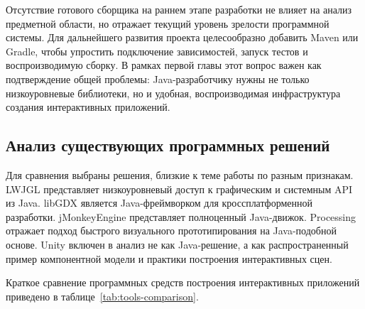 Отсутствие готового сборщика на раннем этапе разработки не влияет на
анализ предметной области, но отражает текущий уровень зрелости
программной системы. Для дальнейшего развития проекта целесообразно
добавить Maven или Gradle, чтобы упростить подключение зависимостей,
запуск тестов и воспроизводимую сборку. В рамках первой главы этот вопрос
важен как подтверждение общей проблемы: Java-разработчику нужны не
только низкоуровневые библиотеки, но и удобная, воспроизводимая
инфраструктура создания интерактивных приложений.

\subsection{Анализ существующих программных решений}

Для сравнения выбраны решения, близкие к теме работы по разным
признакам. LWJGL представляет низкоуровневый доступ к графическим и
системным API из Java. libGDX является Java-фреймворком для
кроссплатформенной разработки. jMonkeyEngine представляет полноценный
Java-движок. Processing отражает подход быстрого визуального
прототипирования на Java-подобной основе. Unity включен в анализ не как
Java-решение, а как распространенный пример компонентной модели и
практики построения интерактивных сцен.

Краткое сравнение программных средств построения интерактивных
приложений приведено в таблице~\ref{tab:tools-comparison}.

\begingroup
\small
\setlength{\tabcolsep}{4pt}
\renewcommand{\arraystretch}{1.2}

